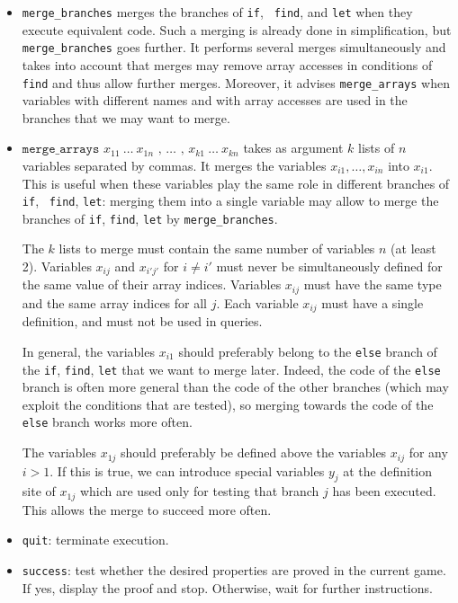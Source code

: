 \documentclass{article}
\begin{document}
\begin{itemize}
\item \texttt{merge\_branches} merges the branches of {\tt if}, {\tt
    find}, and {\tt let} when they execute equivalent code. Such a
  merging is already done in simplification, but
  \texttt{merge\_branches} goes further. It performs several merges
  simultaneously and takes into account that merges may remove array
  accesses in conditions of {\tt find} and thus allow further
  merges. Moreover, it advises {\tt merge\_arrays} when variables with
  different names and with array accesses are used in the branches
  that we may want to merge.

\item $\texttt{merge\_arrays } x_{11}\ \ldots\ x_{1n} \texttt{ , }
  \ldots \texttt{ , } x_{k1}\ \ldots\ x_{kn}$ takes as argument $k$
  lists of $n$ variables separated by commas. It merges the variables
  $x_{i1}, \ldots, x_{in}$ into $x_{i1}$. This is useful when these
  variables play the same role in different branches of {\tt if}, {\tt
    find}, {\tt let}: merging them into a single variable may allow to
  merge the branches of {\tt if}, {\tt find}, {\tt let} by
  \texttt{merge\_branches}. 

  The $k$ lists to merge must contain the same number of variables $n$
  (at least 2). Variables $x_{ij}$ and $x_{i'j'}$ for $i \neq i'$ must
  never be simultaneously defined for the same value of their array
  indices.  Variables $x_{ij}$ must have the same type and the same
  array indices for all $j$. Each variable $x_{ij}$ must have a single
  definition, and must not be used in queries.

  In general, the variables $x_{i1}$ should preferably belong to the
  \texttt{else} branch of the {\tt if}, {\tt find}, {\tt let} that we
  want to merge later. Indeed, the code of the {\tt else} branch is
  often more general than the code of the other branches (which may
  exploit the conditions that are tested), so merging towards the code
  of the {\tt else} branch works more often.

  The variables $x_{1j}$ should preferably be defined above the
  variables $x_{ij}$ for any $i > 1$. If this is true, we can
  introduce special variables $y_j$ at the definition site of $x_{1j}$
  which are used only for testing that branch $j$ has been executed.
  This allows the merge to succeed more often.

\item \texttt{quit}: terminate execution.

\item \texttt{success}: test whether the desired properties are
proved in the current game. If yes, display the proof and stop.
Otherwise, wait for further instructions.


\end{itemize}
\end{document}
